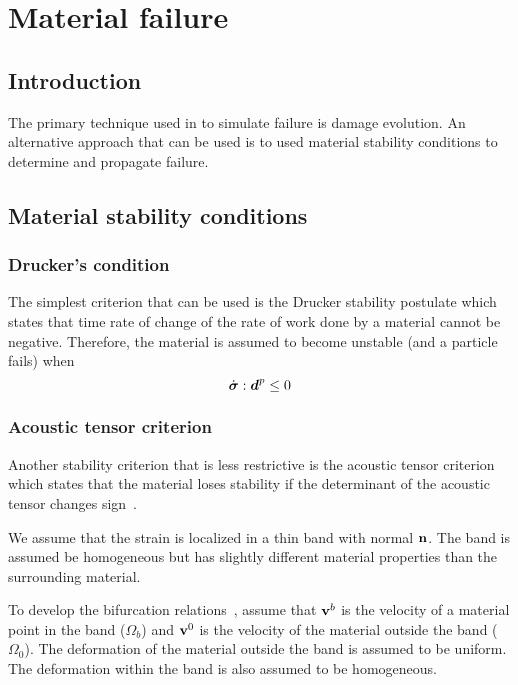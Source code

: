 \chapter{Material failure}

\section{Introduction}
The primary technique used in \Vaango to simulate failure is damage evolution. An alternative
approach that can be used is to used material stability conditions to determine and propagate 
failure.

\section{Material stability conditions}
\subsection{Drucker's condition}
The simplest criterion that can be used is the Drucker stability postulate 
\cite{Drucker1959} which states that time rate of change of the rate of 
work done by a material cannot be negative.  Therefore, the material is 
assumed to become unstable (and a particle fails) when
\begin{equation}
  \dot{\boldsymbol{\sigma}}:\boldsymbol{d}^p \le 0
\end{equation}

\subsection{Acoustic tensor criterion}
Another stability criterion that is less restrictive is the acoustic
tensor criterion which states that the material loses stability if the 
determinant of the acoustic tensor changes sign~\cite{Rudnicki1975,Yamamoto1978,Perzyna1998}.  

We assume that the strain is localized in a thin band with normal $\mathbf{n}$.  The band is 
assumed be homogeneous
but has slightly different material properties than the surrounding material.

To develop the bifurcation relations~\cite{Yamamoto1978}, assume that $\mathbf{v}^b$ is the 
velocity of a material point in the band ($\Omega_b$) and $\mathbf{v}^0$ is the velocity of the 
material outside the band ($\Omega_0$).  The deformation of the material outside the band
is assumed to be uniform.  The deformation within the band is also assumed to
be homogeneous.

